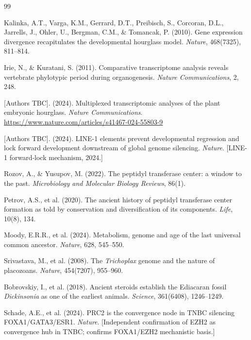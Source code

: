 \documentclass[12pt, a4paper]{article}
\theoremstyle{definition}
\theoremstyle{remark}
\begin{document}
\newpage

\begin{thebibliography}{99}

Kalinka, A.T., Varga, K.M., Gerrard, D.T., Preibisch, S.,
Corcoran, D.L., Jarrells, J., Ohler, U., Bergman, C.M.,
\& Tomancak, P. (2010).
Gene expression divergence recapitulates the developmental
hourglass model.
\textit{Nature}, 468(7325), 811--814.

Irie, N., \& Kuratani, S. (2011).
Comparative transcriptome analysis reveals vertebrate
phylotypic period during organogenesis.
\textit{Nature Communications}, 2, 248.

[Authors TBC]. (2024).
Multiplexed transcriptomic analyses of the plant embryonic
hourglass.
\textit{Nature Communications}.
\url{https://www.nature.com/articles/s41467-024-55803-9}

[Authors TBC]. (2024).
LINE-1 elements prevent developmental regression and lock
forward development downstream of global genome silencing.
\textit{Nature}.
[LINE-1 forward-lock mechanism, 2024.]

Rozov, A., \& Yusupov, M. (2022).
The peptidyl transferase center: a window to the past.
\textit{Microbiology and Molecular Biology Reviews},
86(1).

Petrov, A.S., et al. (2020).
The ancient history of peptidyl transferase center
formation as told by conservation and diversification
of its components.
\textit{Life}, 10(8), 134.

Moody, E.R.R., et al. (2024).
Metabolism, genome and age of the last universal common
ancestor.
\textit{Nature}, 628, 545--550.

Srivastava, M., et al. (2008).
The \textit{Trichoplax} genome and the nature of placozoans.
\textit{Nature}, 454(7207), 955--960.

Bobrovskiy, I., et al. (2018).
Ancient steroids establish the Ediacaran fossil
\textit{Dickinsonia} as one of the earliest animals.
\textit{Science}, 361(6408), 1246--1249.

Schade, A.E., et al. (2024).
PRC2 is the convergence node in TNBC silencing
FOXA1/GATA3/ESR1.
\textit{Nature}.
[Independent confirmation of EZH2 as convergence hub
in TNBC; confirms FOXA1/EZH2 mechanistic basis.]


\end{thebibliography}
\end{document}
